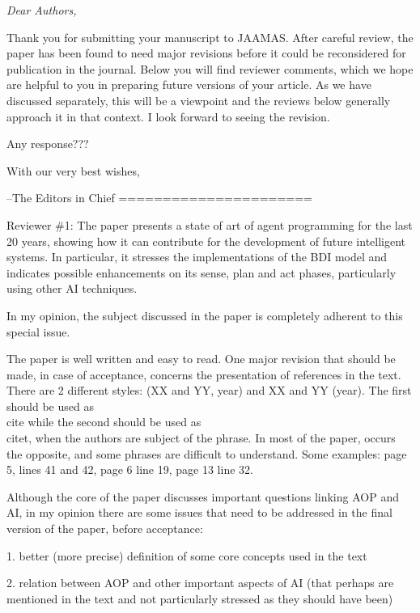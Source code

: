 \documentclass[12pt]{article}
\newenvironment{reviews}{\bigskip\itshape}{\upshape\bigskip}
\newenvironment{response}{\bigskip\normalfont}{\bigskip}
\begin{document}
\begin{reviews}
Dear Authors,

Thank you for submitting your manuscript to JAAMAS. After careful review, the paper has been found to need major revisions before it could be reconsidered for publication in the journal. Below you will find reviewer comments, which we hope are helpful to you in preparing future versions of your article. As we have discussed separately, this will be a viewpoint and the reviews below generally approach it in that context. I look forward to seeing the revision.

\begin{response}
Any response???
\end{response}


With our very best wishes,

--The Editors in Chief
======================

Reviewer \#1: The paper presents a state of art of agent programming for the last 20
years, showing how it can contribute for the development of future
intelligent systems. In particular, it stresses the implementations
of the BDI model and indicates possible enhancements on its sense,
plan and act phases, particularly using other AI techniques.

In my opinion, the subject discussed in the paper is completely adherent
to this special issue.

The paper is well written and easy to read. One major revision that
should be made, in case of acceptance, concerns the presentation of
references in the text. There are 2 different styles: (XX and YY,
year) and XX and YY (year). The first should be used as \\cite while
the second should be used as \\citet, when the authors are subject of
the phrase. In most of the paper, occurs the opposite, and some
phrases are difficult to understand. Some examples:
page 5, lines 41 and 42, page 6 line 19, page 13 line 32.

Although the core of the paper discusses important questions linking
AOP and AI, in my opinion there are some issues that need to be
addressed in the final version of the paper, before acceptance:

1. better (more precise)  definition of some core concepts used in the text

2. relation between AOP and other important aspects of AI (that
perhaps are mentioned in the text and not particularly stressed as
they should have been)


\end{reviews}
\end{document}
